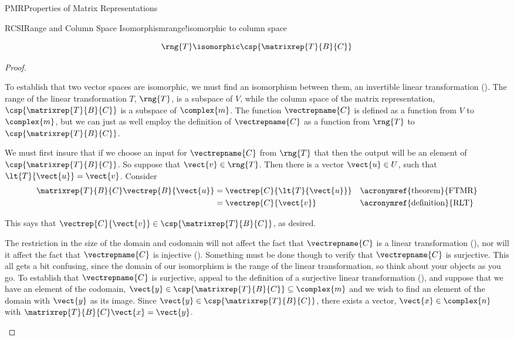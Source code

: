 \begin{subsect}{PMR}{Properties of Matrix Representations}
\begin{theorem}{RCSI}{Range and Column Space Isomorphism}{range!isomorphic to column space}
\begin{para}
%
\begin{equation*}
\rng{T}\isomorphic\csp{\matrixrep{T}{B}{C}}
\end{equation*}
\end{para}
%
\end{theorem}
%
\begin{proof}
\begin{para}To establish that two vector spaces are isomorphic, we must find an isomorphism between them, an invertible linear transformation ().  The range of the linear transformation $T$, $\rng{T}$, is a subspace of $V$, while the column space of the matrix representation, $\csp{\matrixrep{T}{B}{C}}$ is a subspace of $\complex{m}$.  The function $\vectrepname{C}$ is defined as a function from $V$ to $\complex{m}$, but we can just as well employ the definition of $\vectrepname{C}$ as a function from $\rng{T}$ to $\csp{\matrixrep{T}{B}{C}}$.\end{para}
%
\begin{para}We must first insure that if we choose an input for $\vectrepname{C}$ from $\rng{T}$ that then the output will be an element of $\csp{\matrixrep{T}{B}{C}}$.  So suppose that $\vect{v}\in\rng{T}$.  Then there is a vector $\vect{u}\in U$, such that $\lt{T}{\vect{u}}=\vect{v}$.  Consider
%
\begin{align*}
\matrixrep{T}{B}{C}\vectrep{B}{\vect{u}}
&=\vectrep{C}{\lt{T}{\vect{u}}}&&\text{\acronymref{theorem}{FTMR}}\\
%
&=\vectrep{C}{\vect{v}}&&\text{\acronymref{definition}{RLT}}
%
\end{align*}\end{para}
%
\begin{para}This says that $\vectrep{C}{\vect{v}}\in\csp{\matrixrep{T}{B}{C}}$, as desired.\end{para}
%
\begin{para}The restriction in the size of the domain and codomain will not affect the fact that $\vectrepname{C}$ is a linear transformation (), nor will it affect the fact that $\vectrepname{C}$ is injective ().  Something must be done though to verify that $\vectrepname{C}$ is surjective.  This all gets a bit confusing, since the domain of our isomorphism is the range of the linear transformation, so think about your objects as you go.  To establish that $\vectrepname{C}$ is surjective, appeal to the definition of a surjective linear transformation (), and suppose that we have an element of the codomain, $\vect{y}\in\csp{\matrixrep{T}{B}{C}}\subseteq\complex{m}$ and we wish to find an element of the domain with $\vect{y}$ as its image.  Since $\vect{y}\in\csp{\matrixrep{T}{B}{C}}$, there exists a vector, $\vect{x}\in\complex{n}$ with $\matrixrep{T}{B}{C}\vect{x}=\vect{y}$.\end{para}

\end{proof}
\end{subsect}
